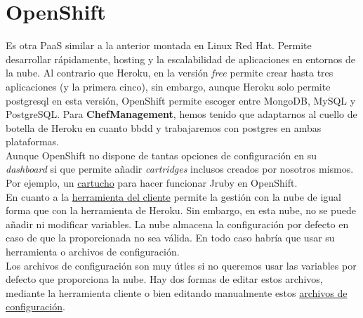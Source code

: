 \vspace*{0.2in}
\section{OpenShift}\label{cap.3.3}
Es otra PaaS similar a la anterior montada en Linux Red Hat. Permite desarrollar rápidamente, hosting y la escalabilidad de aplicaciones en entornos de la nube. Al contrario que Heroku, en la versión \emph{free} permite crear hasta tres aplicaciones (y la primera cinco), sin embargo, aunque Heroku solo permite postgresql en esta versión, OpenShift permite escoger entre MongoDB, MySQL y PostgreSQL. Para \textbf{ChefManagement}, hemos tenido que adaptarnos al cuello de botella de Heroku en cuanto bbdd y trabajaremos con postgres en ambas plataformas. \\

Aunque OpenShift no dispone de tantas opciones de configuración en su \emph{dashboard} si que permite añadir \emph{cartridges} inclusos creados por nosotros mismos. Por ejemplo, un \href{https://github.com/openshift-cartridges/jruby-cartridge}{cartucho} para hacer funcionar Jruby en OpenShift. \\

En cuanto a la \href{https://developers.openshift.com/en/managing-client-tools.html}{herramienta del cliente} permite la gestión con la nube de igual forma que con la herramienta de Heroku. Sin embargo, en esta nube, no se puede añadir ni modificar variables. La nube almacena la configuración por defecto en caso de que la proporcionada no sea válida. En todo caso habría que usar su herramienta o archivos de configuración. \\

Los archivos de configuración son muy útles si no queremos usar las variables por defecto que proporciona la nube. Hay dos formas de editar estos archivos, mediante la herramienta cliente o bien editando manualmente estos \href{https://blog.openshift.com/netsource-partners-shows-the-benefits-of-custom-environment-variables-on-openshift/}{archivos de configuración}.

